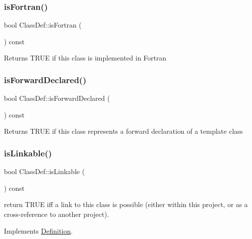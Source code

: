 \subsubsection{\texorpdfstring{isFortran()}{isFortran()}}
{\footnotesize\ttfamily bool Class\+Def\+::is\+Fortran (\begin{DoxyParamCaption}{ }\end{DoxyParamCaption}) const}

Returns T\+R\+UE if this class is implemented in Fortran \mbox{\label{class_class_def_acef8646f7fc385a9cb9858f5b4d4c2b3}} 
\subsubsection{\texorpdfstring{isForwardDeclared()}{isForwardDeclared()}}
{\footnotesize\ttfamily bool Class\+Def\+::is\+Forward\+Declared (\begin{DoxyParamCaption}{ }\end{DoxyParamCaption}) const}

Returns T\+R\+UE if this class represents a forward declaration of a template class \mbox{\label{class_class_def_ab42c120a9326e77882857bc53ab2b7e0}} 
\subsubsection{\texorpdfstring{isLinkable()}{isLinkable()}}
{\footnotesize\ttfamily bool Class\+Def\+::is\+Linkable (\begin{DoxyParamCaption}{ }\end{DoxyParamCaption}) const\hspace{0.3cm}{\ttfamily [virtual]}}

return T\+R\+UE iff a link to this class is possible (either within this project, or as a cross-\/reference to another project). 

Implements \mbox{\hyperlink{class_definition_a4002fd79c2d4dcf667c37c83d4214deb}{Definition}}.

\mbox{\label{class_class_def_a54fd0971529bf396c31a2a5c67acbea7}} 
